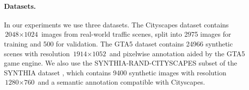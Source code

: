 
\paragraph{Datasets.}
In our experiments we use three datasets.
The Cityscapes dataset \cite{CordtsORREBFRS16} contains $\text{2048} \times \text{1024}$ images from real-world traffic scenes, split into \num{2975} images for training and \num{500} for validation.
The GTA5 dataset \cite{RichterVRK16} contains \num{24966} synthetic scenes with resolution $\text{1914} \times \text{1052}$ and pixelwise annotation aided by the GTA5 game engine.
We also use the SYNTHIA-RAND-CITYSCAPES subset of the SYNTHIA dataset \cite{RosSMVL16}, which contains \num{9400} synthetic images with resolution $\text{1280} \times \text{760}$ and a semantic annotation compatible with Cityscapes.


